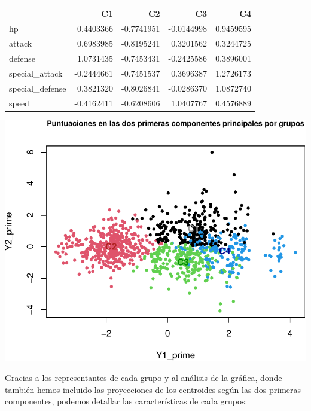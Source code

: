 \documentclass[
  12pt,
]{extreport}
\begin{document}
\begin{table}[H]
\centering\begingroup\fontsize{11.5}{13.5}\selectfont

\begin{tabular}{lrrrr}
\toprule
  & C1 & C2 & C3 & C4\\
\midrule
hp & 0.4403366 & -0.7741951 & -0.0144998 & 0.9459595\\
attack & 0.6983985 & -0.8195241 & 0.3201562 & 0.3244725\\
defense & 1.0731435 & -0.7453431 & -0.2425586 & 0.3896001\\
special\_attack & -0.2444661 & -0.7451537 & 0.3696387 & 1.2726173\\
special\_defense & 0.3821320 & -0.8026841 & -0.0286370 & 1.0872740\\
\addlinespace
speed & -0.4162411 & -0.6208606 & 1.0407767 & 0.4576889\\
\bottomrule
\end{tabular}
\endgroup{}
\end{table}

\begin{center}
\includegraphics{trabajo_files/figure-pdf/unnamed-chunk-43-1.pdf}
\end{center}

Gracias a los representantes de cada grupo y al análisis de la gráfica,
donde también hemos incluido las proyecciones de los centroides según
las dos primeras componentes, podemos detallar las características de
cada grupos:
\end{document}
